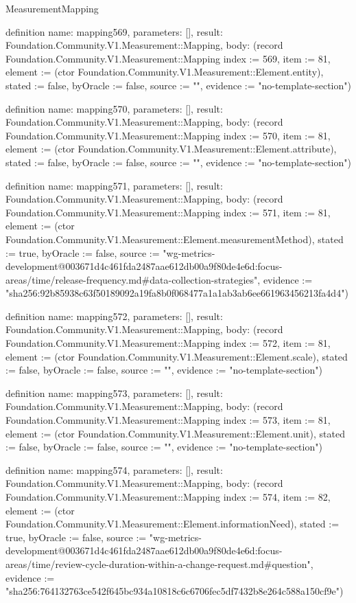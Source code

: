 \begin{lexlean}{MeasurementMapping}
\begin{semanticmodule}
definition{
  name: mapping569,
  parameters: [],
  result: Foundation.Community.V1.Measurement::Mapping,
  body: (record Foundation.Community.V1.Measurement::Mapping {index := 569, item := 81, element := (ctor Foundation.Community.V1.Measurement::Element.entity), stated := false, byOracle := false, source := "", evidence := "no-template-section"})
}

definition{
  name: mapping570,
  parameters: [],
  result: Foundation.Community.V1.Measurement::Mapping,
  body: (record Foundation.Community.V1.Measurement::Mapping {index := 570, item := 81, element := (ctor Foundation.Community.V1.Measurement::Element.attribute), stated := false, byOracle := false, source := "", evidence := "no-template-section"})
}

definition{
  name: mapping571,
  parameters: [],
  result: Foundation.Community.V1.Measurement::Mapping,
  body: (record Foundation.Community.V1.Measurement::Mapping {index := 571, item := 81, element := (ctor Foundation.Community.V1.Measurement::Element.measurementMethod), stated := true, byOracle := false, source := "wg-metrics-development@003671d4c461fda2487aae612db00a9f80de4e6d:focus-areas/time/release-frequency.md#data-collection-strategies", evidence := "sha256:92b85938c63f50189092a19fa8b0f068477a1a1ab3ab6ee661963456213fa4d4"})
}

definition{
  name: mapping572,
  parameters: [],
  result: Foundation.Community.V1.Measurement::Mapping,
  body: (record Foundation.Community.V1.Measurement::Mapping {index := 572, item := 81, element := (ctor Foundation.Community.V1.Measurement::Element.scale), stated := false, byOracle := false, source := "", evidence := "no-template-section"})
}

definition{
  name: mapping573,
  parameters: [],
  result: Foundation.Community.V1.Measurement::Mapping,
  body: (record Foundation.Community.V1.Measurement::Mapping {index := 573, item := 81, element := (ctor Foundation.Community.V1.Measurement::Element.unit), stated := false, byOracle := false, source := "", evidence := "no-template-section"})
}

definition{
  name: mapping574,
  parameters: [],
  result: Foundation.Community.V1.Measurement::Mapping,
  body: (record Foundation.Community.V1.Measurement::Mapping {index := 574, item := 82, element := (ctor Foundation.Community.V1.Measurement::Element.informationNeed), stated := true, byOracle := false, source := "wg-metrics-development@003671d4c461fda2487aae612db00a9f80de4e6d:focus-areas/time/review-cycle-duration-within-a-change-request.md#question", evidence := "sha256:764132763ce542f645bc934a10818c6c6706fec5df7432b8e264c588a150cf9e"})
}


\end{semanticmodule}
\end{lexlean}
